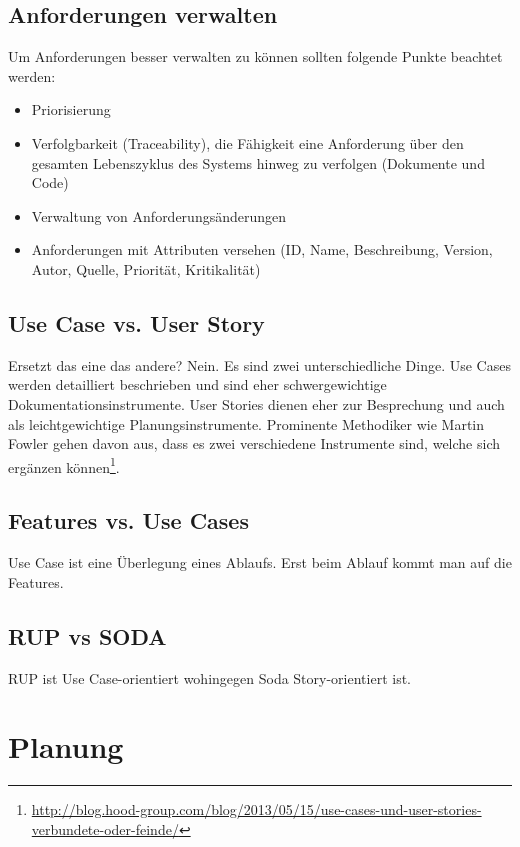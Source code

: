 \subsection{Anforderungen verwalten}

Um Anforderungen besser verwalten zu können sollten folgende Punkte beachtet werden:
\begin{itemize}
	\item Priorisierung
	\item Verfolgbarkeit (Traceability), die Fähigkeit eine Anforderung über den gesamten Lebenszyklus des Systems hinweg zu verfolgen (Dokumente und Code)
	\item Verwaltung von Anforderungsänderungen
	\item Anforderungen mit Attributen versehen (ID, Name, Beschreibung, Version, Autor, Quelle, Priorität, Kritikalität) 
\end{itemize}

\subsection{Use Case vs. User Story}
Ersetzt das eine das andere? Nein. Es sind zwei unterschiedliche Dinge. Use Cases werden detailliert beschrieben und sind eher schwergewichtige Dokumentationsinstrumente. User Stories dienen eher zur Besprechung und auch als leichtgewichtige Planungsinstrumente. Prominente Methodiker wie Martin Fowler gehen davon aus, dass es zwei verschiedene Instrumente sind, welche sich ergänzen können\footnote{\href{http://blog.hood-group.com/blog/2013/05/15/use-cases-und-user-stories-verbundete-oder-feinde/}{http://blog.hood-group.com/blog/2013/05/15/use-cases-und-user-stories-verbundete-oder-feinde/}}.

\subsection{Features vs. Use Cases}
Use Case ist eine Überlegung eines Ablaufs. Erst beim Ablauf kommt man auf die Features.

\subsection{RUP vs SODA}
RUP ist Use Case-orientiert wohingegen Soda Story-orientiert ist.

\section{Planung}

